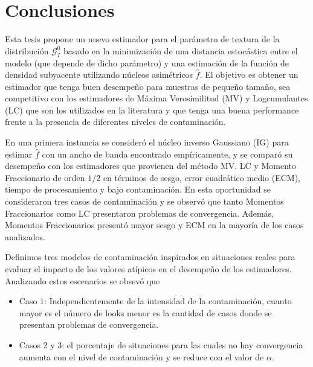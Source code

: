 
\chapter{Conclusiones}
\label{Conclusiones}

Esta tesis propone un nuevo estimador para el parámetro de textura de la distribución $\mathcal{G}_I^0$ basado en la minimización de una distancia estocástica entre el modelo (que depende de dicho parámetro) y una estimación de la función de densidad subyacente utilizando núcleos asimétricos $\widehat{f}$. El objetivo es obtener un estimador que tenga buen desempeño para muestras de pequeño tamaño, sea competitivo con los estimadores de Máxima Verosimilitud (MV) y Logcumulantes (LC) que son los utilizados en la literatura y que tenga una buena performance frente a la presencia de diferentes niveles de contaminación.



En una primera instancia se consideró el núcleo inverso Gaussiano (IG) para estimar $\widehat{f}$ con un ancho de banda encontrado empíricamente, y se comparó su desempeño con los estimadores que provienen del método MV, LC y Momento Fraccionario de orden $1/2$ en términos de sesgo, error cuadrático medio (ECM), tiempo de procesamiento y bajo contaminación. En esta oportunidad se consideraron tres casos de contaminación y se observó que tanto Momentos Fraccionarios como LC presentaron problemas de convergencia. Además, Momentos Fraccionarios presentó mayor sesgo y ECM en la mayoría de los casos analizados.

Definimos tres modelos de contaminación inspirados en situaciones reales para evaluar el impacto de los valores atípicos en el desempeño de los estimadores. Analizando estos escenarios se obsevó que

\begin{itemize}
	\item Caso 1: Independientemente de la intensidad de la contaminación, cuanto mayor es el número de looks menor es la cantidad de casos donde se presentan problemas de convergencia. 
	\item  Casos 2 y 3: el porcentaje de situaciones para las cuales no hay convergencia aumenta con el nivel de contaminación y se reduce con el valor de $\alpha$.
\end{itemize}

